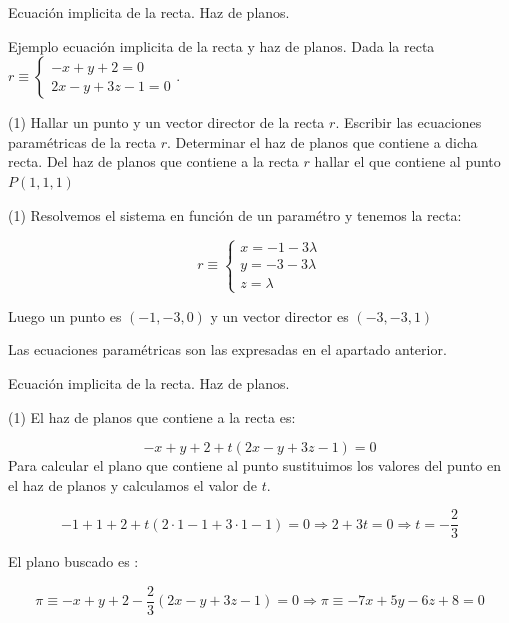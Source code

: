 \documentclass[8pt]{beamer}
\begin{document}
\begin{frame}[t]{Ecuación implicita de la recta. Haz de planos.}
\begin{exampleblock}{Ejemplo ecuación implicita de la recta y haz de planos.}
Dada la recta $r \equiv \begin{cases} -x+y+2=0 \\ 2x-y+3z-1=0 \end{cases}$.
\begin{tasks}[label=\alph*)](1)
\task Hallar un punto y un vector director de la recta $r$.
\task Escribir las ecuaciones paramétricas de la recta $r$.
\task Determinar el haz de planos que contiene a dicha recta.
\task Del haz de planos que contiene a la recta $r$ hallar el que contiene al punto $P(1,1,1)$
\end{tasks}
\end{exampleblock}

\begin{tasks}[label=\alph*)](1)
\task Resolvemos el sistema en función de un paramétro y tenemos la recta:

\[ r \equiv \begin{cases} x= -1 -3\lambda \\ y=-3-3\lambda  \\ z= \lambda \end{cases} \]

Luego un punto es $(-1,-3,0)$ y un vector director es $(-3,-3,1)$

\task Las ecuaciones paramétricas son las expresadas en el apartado anterior.
\end{tasks}
\end{frame}

\begin{frame}[t]{Ecuación implicita de la recta. Haz de planos.}

\begin{tasks}[label=\alph*),resume](1)
\task El haz de planos que contiene a la recta es:

\[ -x+y+2+t (2x-y+3z-1)=0 \]
\task Para calcular el plano que contiene al punto sustituimos los valores del punto en el haz de planos y calculamos el valor de $t$.

\[ -1+1+2+t (2\cdot 1-1+3 \cdot 1-1)=0 \Rightarrow 2+3t=0 \Rightarrow t=-\frac{2}{3} \]

El plano buscado es : 

\[\pi \equiv -x+y+2-\frac{2}{3} (2x-y+3z-1)=0 \Rightarrow \pi \equiv -7x+5y-6z+8=0  \]
\end{tasks}

\end{frame}
\end{document}
